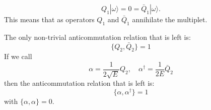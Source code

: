 \begin{equation}
  Q_1|\omega\rangle = 0 = \bar{Q}_{\dot{1}}|\omega\rangle.
\end{equation}
This means that as operators $Q_1$ and $\bar{Q}_{\dot{1}}$ annihilate the
multiplet. 
\par The only non-trivial anticommutation relation that is left is:
\begin{equation}
  \{Q_2,\bar{Q}_{\dot{2}}\} = 1
\end{equation}
If we call
\begin{equation}
  \alpha = \frac{1}{2\sqrt{E}}Q_2,\quad \alpha^\dagger
  = \frac{1}{2E}\bar{Q}_{\dot{2}}
\end{equation}
then the anticommutation relation that is left is:
\begin{equation}
  \{\alpha,\alpha^\dagger\} = 1
\end{equation}
with $\{\alpha,\alpha\} = 0$.


